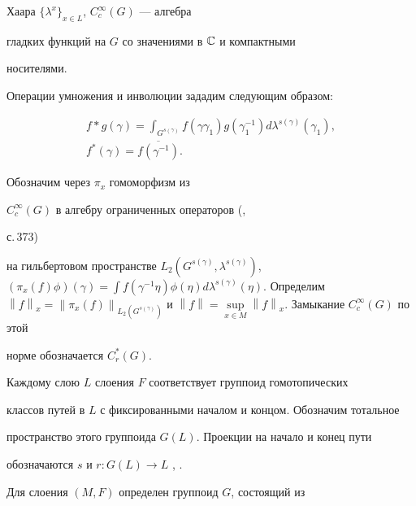 Хаара  $\{\lambda^x\}_{x\in L}$, $C^{\infty}_{c}(G)$ --- алгебра


гладких функций на $G$ со значениями в $\Bbb{C}$ и компактными


носителями.





Операции умножения и инволюции зададим следующим образом:


\begin{gather*}


f * g (\gamma)= \int_{G^{s(\gamma)}} f(\gamma \gamma_1)


g(\gamma_1^{-1})d \lambda^{s(\gamma)}(\gamma_1),\\


%


f^{*}(\gamma)=\overline{f(\gamma^{-1})}.


\end{gather*}


Обозначим через $\pi_x$  гомоморфизм из


$C^{\infty}_{c}(G)$ в алгебру ограниченных операторов (\cite{Sher},


с.\,373)


на гильбертовом пространстве $L_2(G^{s(\gamma)},


\lambda^{s(\gamma)})$, $(\pi_x(f)\phi)(\gamma)=\displaystyle\int f(\gamma^{-1}


\eta) \phi(\eta) d \lambda^{s(\gamma)}(\eta)$. Определим $\left\| {f}


\right\|_x=\left\| {\pi_x(f)}


\right\|_{L_2(G^{s(\gamma)})}$ и $\left\| {f} \right\|=\sup\limits_{x \in


M} \left\| {f} \right\|_x $. Замыкание $C^{\infty}_c(G)$ по этой


норме обозначается $C^*_r(G)$.





Каждому слою $L$ слоения $F$ соответствует группоид гомотопических


классов путей в $L$ с фиксированными началом и концом. Обозначим тотальное


пространство этого группоида $G(L)$. Проекции  на начало и конец пути


обозначаются $s$ и $r: G(L) \to L$ \cite{LR}, \cite{MS}.





Для слоения $(M, F)$ определен группоид $G$, состоящий из


